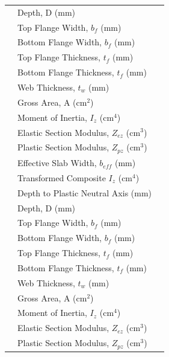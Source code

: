\documentclass[12pt,a4paper]{report}
\numberwithin{table}{chapter}
\numberwithin{figure}{chapter}
\begin{document}
\begin{longtable}{|C{2.5cm}|L{8.0cm}|>{\centering\arraybackslash}p{5.0cm}|}
 & \textnormal{Depth, D (mm)} &  \\[6pt]
 & \textnormal{Top Flange Width, $b_f$ (mm)} &  \\[6pt]
 & \textnormal{Bottom Flange Width, $b_f$ (mm)} &  \\[6pt]
 & \textnormal{Top Flange Thickness, $t_f$ (mm)} &  \\[6pt]
 & \textnormal{Bottom Flange Thickness, $t_f$ (mm)} &  \\[6pt]
 & \textnormal{Web Thickness, $t_w$ (mm)} &  \\[6pt]
 & \textnormal{Gross Area, A (cm$^2$)} &  \\[6pt]
 & \textnormal{Moment of Inertia, $I_z$ (cm$^4$)} &  \\[6pt]
 & \textnormal{Elastic Section Modulus, $Z_{ez}$ (cm$^3$)} &  \\[6pt]
 & \textnormal{Plastic Section Modulus, $Z_{pz}$ (cm$^3$)} &  \\[6pt]
 & \textnormal{Effective Slab Width, $b_{eff}$ (mm)} &  \\[6pt]
 & \textnormal{Transformed Composite $I_z$ (cm$^4$)} &  \\[6pt]
 & \textnormal{Depth to Plastic Neutral Axis (mm)} &  \\[6pt]
\hline
{} & \textnormal{Depth, D (mm)} &  \\[6pt]
 & \textnormal{Top Flange Width, $b_f$ (mm)} &  \\[6pt]
 & \textnormal{Bottom Flange Width, $b_f$ (mm)} &  \\[6pt]
 & \textnormal{Top Flange Thickness, $t_f$ (mm)} &  \\[6pt]
 & \textnormal{Bottom Flange Thickness, $t_f$ (mm)} &  \\[6pt]
 & \textnormal{Web Thickness, $t_w$ (mm)} &  \\[6pt]
 & \textnormal{Gross Area, A (cm$^2$)} &  \\[6pt]
 & \textnormal{Moment of Inertia, $I_z$ (cm$^4$)} &  \\[6pt]
 & \textnormal{Elastic Section Modulus, $Z_{ez}$ (cm$^3$)} &  \\[6pt]
 & \textnormal{Plastic Section Modulus, $Z_{pz}$ (cm$^3$)} &  \\[6pt]

\end{longtable}
\end{document}
